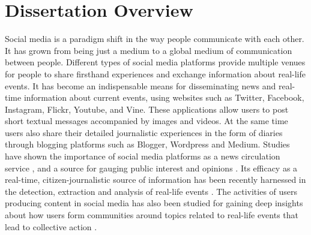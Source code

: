 
\chapter{Dissertation Overview} %

\label{overview} %



Social media is a paradigm shift in the way people communicate with each other. It has grown from being just a medium to a global medium of communication between people. Different types of social media platforms provide multiple venues for people to share firsthand experiences and exchange information about real-life events. It has become an indispensable means for disseminating news and real-time information about current events, using websites such as Twitter, Facebook, Instagram, Flickr, Youtube, and Vine. These applications allow users to post short textual messages accompanied by images and videos. At the same time users also share their detailed journalistic experiences in the form of diaries through blogging platforms such as Blogger, Wordpress and Medium. Studies have shown the importance of social media platforms as a news circulation service \cite{phelan2009using}, and a source for gauging public interest and opinions \cite{o2010tweets,singh2010clustering,singh2010mining,agarwal2012online}. Its efficacy as a real-time, citizen-journalistic source of information has been recently harnessed in the detection, extraction and analysis of real-life events \cite{sakaki2013tweet,popescu2011extracting,purohit2013twitris}. The activities of users producing content in social media has also been studied for gaining deep insights about how users form communities around topics related to real-life events \cite{agarwal2013grouping,agarwal2014time,sen2012identifying} that lead to collective action \cite{agarwal2014online,agarwal2012raising}.

